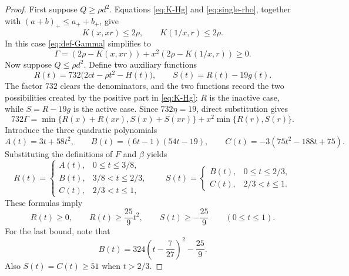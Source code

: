 \documentclass[11pt]{article}
\numberwithin{equation}{section}
\theoremstyle{remark}
\begin{document}
\begin{proof}
First suppose $Q\ge\rho d^2$.  Equations \eqref{eq:K-Hg} and
\eqref{eq:single-rho}, together with
$(a+b)_+\le a_++b_+$, give
\[
 K(x,xr)\le2\rho,
 \qquad
 K(1/x,r)\le2\rho.
\]
In this case \eqref{eq:def-Gamma} simplifies to
\[
 \Gamma=(2\rho-K(x,xr))
 +x^2(2\rho-K(1/x,r))\ge0.
\]
Now suppose $Q\le\rho d^2$.  Define two auxiliary functions
\begin{equation}\label{eq:def-RS}
 R(t)=732\bigl(2ct-\rho t^2-H(t)\bigr),
 \qquad
 S(t)=R(t)-19g(t).
\end{equation}
The factor $732$ clears the denominators, and the two functions record the
two possibilities created by the positive part in \eqref{eq:K-Hg}: $R$ is
the inactive case, while $S=R-19g$ is the active case.  Since
$732\eta=19$, direct substitution gives
\begin{equation}\label{eq:min-RS}
 732\Gamma
 =\min\{R(x)+R(xr),S(x)+S(xr)\}
 +x^2\min\{R(r),S(r)\}.
\end{equation}
Introduce the three quadratic polynomials
\begin{equation}\label{eq:def-ABC}
 A(t)=3t+58t^2,
 \qquad
 B(t)=(6t-1)(54t-19),
 \qquad
 C(t)=-3(75t^2-188t+75).
\end{equation}
Substituting the definitions of $F$ and $\beta$ yields
\begin{equation}\label{eq:R-pieces}
 R(t)=
 \begin{cases}
 A(t),&0\le t\le3/8,\\
 B(t),&3/8<t\le2/3,\\
 C(t),&2/3<t\le1,
 \end{cases}
 \qquad
 S(t)=
 \begin{cases}
 B(t),&0\le t\le2/3,\\
 C(t),&2/3<t\le1.
 \end{cases}
\end{equation}
These formulas imply
\begin{equation}\label{eq:RS-basic}
 R(t)\ge0,
 \qquad
 R(t)\ge\frac{25}{9}t^2,
 \qquad
 S(t)\ge-\frac{25}{9}
 \qquad(0\le t\le1).
\end{equation}
For the last bound, note that
\begin{equation}\label{eq:B-square}
 B(t)=324\left(t-\frac7{27}\right)^2-\frac{25}{9}.
\end{equation}
Also $S(t)=C(t)\ge51$ when $t>2/3$.


\end{proof}
\end{document}
